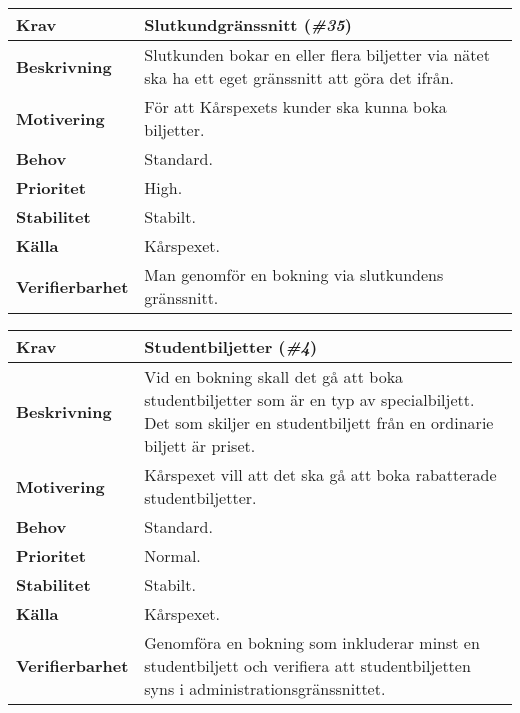 \documentclass[a4paper, twoside, 11pt, titlepage]{article}
\begin{document}
		\begin{tabular} { p{2.6cm} p{12.5cm} }
			\hline
			\sffamily\textbf{Krav} & Slutkundgränssnitt (\emph{\#35})  \\
			\hline
			\sffamily\textbf{Beskrivning} & Slutkunden bokar en eller flera biljetter via nätet ska ha ett eget gränssnitt att göra det ifrån.  \\
			\hline
			\sffamily\textbf{Motivering} & För att Kårspexets kunder ska kunna boka biljetter.  \\
			\hline
			\sffamily\textbf{Behov} & Standard.  \\
			\hline
			\sffamily\textbf{Prioritet} & High.  \\
			\hline
			\sffamily\textbf{Stabilitet} & Stabilt.  \\
			\hline
			\sffamily\textbf{Källa} & Kårspexet.  \\
			\hline
			\sffamily\textbf{Verifierbarhet} & Man genomför en bokning via slutkundens gränssnitt.  \\
			\hline
		\end{tabular}
		\vspace{6mm}

		\begin{tabular} { p{2.6cm} p{12.5cm} }
			\hline
			\sffamily\textbf{Krav} & Studentbiljetter (\emph{\#4})  \\
			\hline
			\sffamily\textbf{Beskrivning} & Vid en bokning skall det gå att boka studentbiljetter som är en typ av specialbiljett. Det som skiljer en studentbiljett från en ordinarie biljett är priset.  \\
			\hline
			\sffamily\textbf{Motivering} & Kårspexet vill att det ska gå att boka rabatterade studentbiljetter.  \\
			\hline
			\sffamily\textbf{Behov} & Standard.  \\
			\hline
			\sffamily\textbf{Prioritet} & Normal.  \\
			\hline
			\sffamily\textbf{Stabilitet} & Stabilt.  \\
			\hline
			\sffamily\textbf{Källa} & Kårspexet.  \\
			\hline
			\sffamily\textbf{Verifierbarhet} & Genomföra en bokning som inkluderar minst en studentbiljett och verifiera att studentbiljetten syns i administrationsgränssnittet.  \\
			\hline
		\end{tabular}
		\vspace{6mm}
\end{document}
